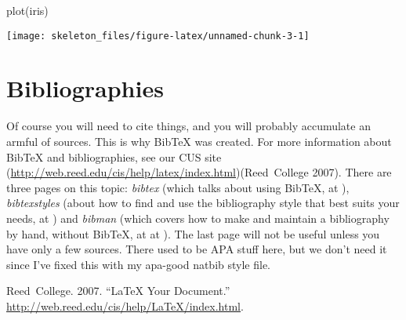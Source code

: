\documentclass[12pt,twoside]{reedthesis}
\begin{document}
\begin{CodeChunk}
\begin{CodeInput}
plot(iris)
\end{CodeInput}


\begin{center}\texttt{[image: skeleton\_files/figure-latex/unnamed-chunk-3-1]} \end{center}

\end{CodeChunk}

\section{Bibliographies}

Of course you will need to cite things, and you will probably accumulate
an armful of sources. This is why BibTeX was created. For more
information about BibTeX and bibliographies, see our CUS site
(\url{http://web.reed.edu/cis/help/latex/index.html})(Reed{~}College
2007). There are three pages on this topic: \emph{bibtex} (which talks
about using BibTeX, at ), \emph{bibtexstyles} (about how to find and use
the bibliography style that best suits your needs, at ) and
\emph{bibman} (which covers how to make and maintain a bibliography by
hand, without BibTeX, at at ). The last page will not be useful unless
you have only a few sources. There used to be APA stuff here, but we
don't need it since I've fixed this with my apa-good natbib style file.

Reed{~}College. 2007. ``LaTeX Your Document.''
\url{http://web.reed.edu/cis/help/LaTeX/index.html}.


%
\end{document}
